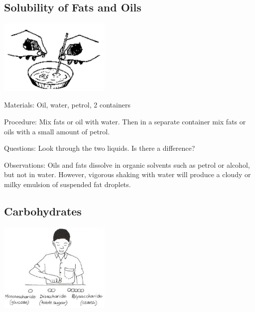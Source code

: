 \begin{multicols}{2}
\subsection{Solubility of Fats and Oils} %

\begin{center}
\includegraphics[width=0.4\textwidth]{./img/source/fats-oils-solubility.png}
\end{center}

\begin{description*}
\item[Materials:]{Oil, water, petrol, 2 containers}
\item[Procedure:]{Mix fats or oil with water. Then in a separate container mix fats or oils with a small amount
of petrol.}
\item[Questions:]{Look through the two liquids. Is there a difference?}
\item[Observations:]{Oils and fats dissolve in organic solvents such as petrol or alcohol, but not in water.
However, vigorous shaking with water will produce a cloudy or milky emulsion of suspended
fat droplets.}
\end{description*}

\subsection{Carbohydrates}  %

\begin{center}
\includegraphics[width=0.4\textwidth]{./img/vso/carbohydrates.jpg}
\end{center}


\end{multicols}

